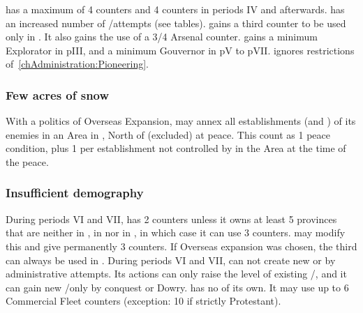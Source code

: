 \bparag \SUE has a maximum of 4 \TP counters and 4 \COL counters in
periods IV and afterwards.
\bparag \SUE has an increased number of \TP/\COL attempts (see tables).
\bparag \SUE gains a third \ARMY counter to be used only in \ROTW.
It also gains the use of a 3/4 Arsenal counter.
\bparag \SUE gains a minimum Explorator in pIII, and a minimum Gouvernor
in pV to pVII.
\bparag \SUE ignores restrictions of~\ref{chAdministration:Pioneering}.

\subsubsection{Few acres of snow}
\aparag With a politics of Overseas Expansion, \SUE may annex all
establishments (\COL and \TP) of its enemies in an Area in
\continentAmerica, North of \granderegionChichimeca (excluded) at peace.
\bparag This count as 1 peace condition, plus 1 per establishment not
controlled by \SUE in the Area at the time of the peace.


\subsubsection{Insufficient demography}
\aparag During periods VI and VII, \SUE has 2 \ARMY counters unless it
owns at least 5 provinces that are neither in , in
 nor in , in which case it can use 3
\ARMY counters. 
\bparag {} may modify this and give \SUE
permanently 3 \ARMY counters.
\bparag If Overseas expansion was chosen, the third \ARMY can always be
used in \ROTW.
\aparag During periods VI and VII, \SUE can not create new \COL or \TP by
administrative attempts. Its actions can only raise the level of
existing \COL/\TP, and it can gain new \TP/\COL only by conquest or
Dowry.
\aparag \SUE has no \CTZ of its own. It may use up to 6 Commercial
Fleet counters (exception: 10 if strictly Protestant).


